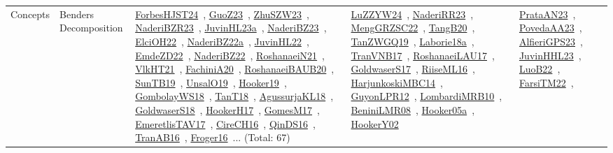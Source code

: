 {\begin{longtable}{lp{3cm}>{\raggedright\arraybackslash}p{6cm}>{\raggedright\arraybackslash}p{6cm}>{\raggedright\arraybackslash}p{8cm}}
Concepts & Benders Decomposition & \href{../works/ForbesHJST24.pdf}{ForbesHJST24}~\cite{ForbesHJST24}, \href{../works/GuoZ23.pdf}{GuoZ23}~\cite{GuoZ23}, \href{../works/ZhuSZW23.pdf}{ZhuSZW23}~\cite{ZhuSZW23}, \href{../works/NaderiBZR23.pdf}{NaderiBZR23}~\cite{NaderiBZR23}, \href{../works/JuvinHL23a.pdf}{JuvinHL23a}~\cite{JuvinHL23a}, \href{../works/NaderiBZ23.pdf}{NaderiBZ23}~\cite{NaderiBZ23}, \href{../works/ElciOH22.pdf}{ElciOH22}~\cite{ElciOH22}, \href{../works/NaderiBZ22a.pdf}{NaderiBZ22a}~\cite{NaderiBZ22a}, \href{../works/JuvinHL22.pdf}{JuvinHL22}~\cite{JuvinHL22}, \href{../works/EmdeZD22.pdf}{EmdeZD22}~\cite{EmdeZD22}, \href{../works/NaderiBZ22.pdf}{NaderiBZ22}~\cite{NaderiBZ22}, \href{../works/RoshanaeiN21.pdf}{RoshanaeiN21}~\cite{RoshanaeiN21}, \href{../works/VlkHT21.pdf}{VlkHT21}~\cite{VlkHT21}, \href{../works/FachiniA20.pdf}{FachiniA20}~\cite{FachiniA20}, \href{../works/RoshanaeiBAUB20.pdf}{RoshanaeiBAUB20}~\cite{RoshanaeiBAUB20}, \href{../works/SunTB19.pdf}{SunTB19}~\cite{SunTB19}, \href{../works/UnsalO19.pdf}{UnsalO19}~\cite{UnsalO19}, \href{../works/Hooker19.pdf}{Hooker19}~\cite{Hooker19}, \href{../works/GombolayWS18.pdf}{GombolayWS18}~\cite{GombolayWS18}, \href{../works/TanT18.pdf}{TanT18}~\cite{TanT18}, \href{../works/AgussurjaKL18.pdf}{AgussurjaKL18}~\cite{AgussurjaKL18}, \href{../works/GoldwaserS18.pdf}{GoldwaserS18}~\cite{GoldwaserS18}, \href{../works/HookerH17.pdf}{HookerH17}~\cite{HookerH17}, \href{../works/GomesM17.pdf}{GomesM17}~\cite{GomesM17}, \href{../works/EmeretlisTAV17.pdf}{EmeretlisTAV17}~\cite{EmeretlisTAV17}, \href{../works/CireCH16.pdf}{CireCH16}~\cite{CireCH16}, \href{../works/QinDS16.pdf}{QinDS16}~\cite{QinDS16}, \href{../works/TranAB16.pdf}{TranAB16}~\cite{TranAB16}, \href{../works/Froger16.pdf}{Froger16}~\cite{Froger16}... (Total: 67) & \href{../works/LuZZYW24.pdf}{LuZZYW24}~\cite{LuZZYW24}, \href{../works/NaderiRR23.pdf}{NaderiRR23}~\cite{NaderiRR23}, \href{../works/MengGRZSC22.pdf}{MengGRZSC22}~\cite{MengGRZSC22}, \href{../works/TangB20.pdf}{TangB20}~\cite{TangB20}, \href{../works/TanZWGQ19.pdf}{TanZWGQ19}~\cite{TanZWGQ19}, \href{../works/Laborie18a.pdf}{Laborie18a}~\cite{Laborie18a}, \href{../works/TranVNB17.pdf}{TranVNB17}~\cite{TranVNB17}, \href{../works/RoshanaeiLAU17.pdf}{RoshanaeiLAU17}~\cite{RoshanaeiLAU17}, \href{../works/GoldwaserS17.pdf}{GoldwaserS17}~\cite{GoldwaserS17}, \href{../works/RiiseML16.pdf}{RiiseML16}~\cite{RiiseML16}, \href{../works/HarjunkoskiMBC14.pdf}{HarjunkoskiMBC14}~\cite{HarjunkoskiMBC14}, \href{../works/GuyonLPR12.pdf}{GuyonLPR12}~\cite{GuyonLPR12}, \href{../works/LombardiMRB10.pdf}{LombardiMRB10}~\cite{LombardiMRB10}, \href{../works/BeniniLMR08.pdf}{BeniniLMR08}~\cite{BeniniLMR08}, \href{../works/Hooker05a.pdf}{Hooker05a}~\cite{Hooker05a}, \href{../works/HookerY02.pdf}{HookerY02}~\cite{HookerY02} & \href{../works/PrataAN23.pdf}{PrataAN23}~\cite{PrataAN23}, \href{../works/PovedaAA23.pdf}{PovedaAA23}~\cite{PovedaAA23}, \href{../works/AlfieriGPS23.pdf}{AlfieriGPS23}~\cite{AlfieriGPS23}, \href{../works/JuvinHHL23.pdf}{JuvinHHL23}~\cite{JuvinHHL23}, \href{../works/LuoB22.pdf}{LuoB22}~\cite{LuoB22}, \href{../works/FarsiTM22.pdf}{FarsiTM22}~\cite{FarsiTM22}, 
\end{longtable}}
